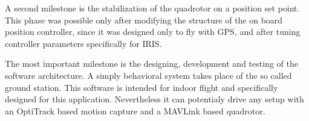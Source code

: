 A second milestone is the stabilization of the quadrotor on a position set point. This phase was possible only after modifying the structure of the on board position controller, since it was designed only to fly with GPS, and after tuning controller parameters specifically for IRIS. 

The most important milestone is the designing, development and testing of the software architecture. A simply behavioral system takes place of the so called ground station. This software is intended for indoor flight and specifically designed for this application. Nevertheless it can potentialy drive any setup with an OptiTrack based motion capture and a MAVLink based quadrotor. 
